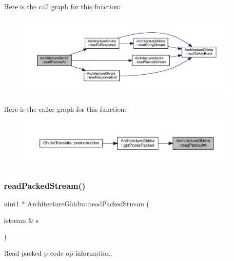 Here is the call graph for this function\+:
\nopagebreak
\begin{figure}[H]
\begin{center}
\leavevmode
\includegraphics[width=350pt]{class_architecture_ghidra_ae2bca9976342b1edd992bf084a028b0b_cgraph}
\end{center}
\end{figure}
Here is the caller graph for this function\+:
\nopagebreak
\begin{figure}[H]
\begin{center}
\leavevmode
\includegraphics[width=350pt]{class_architecture_ghidra_ae2bca9976342b1edd992bf084a028b0b_icgraph}
\end{center}
\end{figure}
\mbox{\label{class_architecture_ghidra_a363a85f21c006421b43cec46fe82df10}} 
\subsubsection{\texorpdfstring{readPackedStream()}{readPackedStream()}}
{\footnotesize\ttfamily uint1 $\ast$ Architecture\+Ghidra\+::read\+Packed\+Stream (\begin{DoxyParamCaption}\item[{istream \&}]{s }\end{DoxyParamCaption})\hspace{0.3cm}{\ttfamily [static]}}



Read packed p-\/code op information. 

